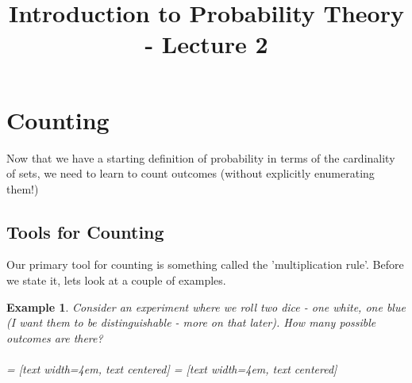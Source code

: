 \documentclass[12pt]{article} %
\date{}
\title{Introduction to Probability Theory - Lecture 2}
\newtheorem{example}{Example}
\begin{document}
\maketitle
\section{Counting}
Now that we have a starting definition of probability in terms of the cardinality of sets, we need to learn to count outcomes (without explicitly enumerating them!)
\subsection{Tools for Counting}
Our primary tool for counting is something called the 'multiplication rule'. Before we state it, lets look at a couple of examples.
\begin{example}
Consider an experiment where we roll two dice - one white, one blue (I want them to be \emph{distinguishable} - more on that later). How many possible outcomes are there? \\\\

 = [text width=4em, text centered]
 = [text width=4em, text centered]



\end{example}
\end{document}

